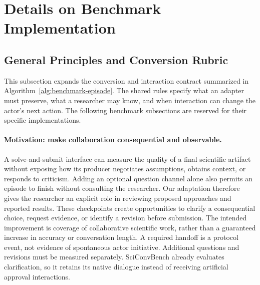 \section{Details on Benchmark Implementation}
\label{app:supplementary}
\label{app:benchmark-implementation}

\subsection{General Principles and Conversion Rubric}
\label{app:conversion-principles}

This subsection expands the conversion and interaction contract summarized
in Algorithm~\ref{alg:benchmark-episode}. The shared rules specify what an
adapter must preserve, what a researcher may know, and when interaction can
change the actor's next action. The following benchmark subsections are
reserved for their specific implementations.

\paragraph{Motivation: make collaboration consequential and observable.}
A solve-and-submit interface can measure the quality of a final scientific
artifact without exposing how its producer negotiates assumptions, obtains
context, or responds to criticism. Adding an optional question channel
alone also permits an episode to finish without consulting the researcher.
Our adaptation therefore gives the researcher an explicit role in reviewing
proposed approaches and reported results. These checkpoints create
opportunities to clarify a consequential choice, request evidence, or
identify a revision before submission. The intended improvement is coverage
of collaborative scientific work, rather than a guaranteed increase in
accuracy or conversation length. A required handoff is a protocol event,
not evidence of spontaneous actor initiative. Additional questions and
revisions must be measured separately. SciConvBench already evaluates
clarification, so it retains its native dialogue instead of receiving
artificial approval interactions.

